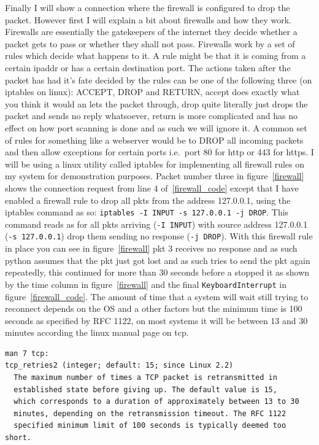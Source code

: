 \documentclass[titlepage]{article}
\begin{document}
Finally I will show a connection where the firewall is configured to drop the packet. However first
I will explain a bit about firewalls and how they work. Firewalls are essentially the gatekeepers
of the internet they decide whether a packet gets to pass or whether they shall not pass. Firewalls
work by a set of rules which decide what happens to it. A rule might be that it is coming from a certain
\gls{ipaddr} or has a certain destination port. The actions taken after the packet has had it's fate
decided by the rules can be one of the following three (on iptables on linux): ACCEPT, DROP and RETURN,
accept does exactly what you think it would an lets the packet through, drop quite literally just drops
the packet and sends no reply whatsoever, return is more complicated and has no effect on how port
scanning is done and as such we will ignore it. A common set of rules for something like a webserver
would be to DROP all incoming packets and then allow exceptions for certain ports i.e.\ port 80 for
\gls{http} or 443 for \gls{https}. I will be using a linux utility called iptables for implementing
all firewall rules on my system for demonstration purposes. Packet number three in
figure~\ref{firewall} shows the connection request from line 4 of~\ref{firewall_code} except
that I have enabled a firewall rule to drop all \glspl{pkt} from the address 127.0.0.1, using
the iptables command as so: \verb$iptables -I INPUT -s 127.0.0.1 -j DROP$. This command reads
as for all \glspl{pkt} arriving (\verb|-I INPUT|) with source address 127.0.0.1 (\verb|-s 127.0.0.1|)
drop them sending no response (\verb|-j DROP|). With this firewall rule in place you can see in
figure~\ref{firewall} \gls{pkt} 3 receives no response and as such python assumes that the \gls{pkt}
just got lost and as such tries to send the \gls{pkt} again repeatedly, this continued for more than
30 seconds before a stopped it as shown by the time column in figure~\ref{firewall} and the final
\verb|KeyboardInterrupt| in figure~\ref{firewall_code}. The amount of time that a system will wait
still trying to reconnect depends on the OS and a other factors but the minimum time is 100 seconds
as specified by RFC 1122, on most systems it will be between 13 and 30 minutes according the
linux manual page on \gls{tcp}.
\begin{verbatim}
man 7 tcp:
tcp_retries2 (integer; default: 15; since Linux 2.2)
  The maximum number of times a TCP packet is retransmitted in
  established state before giving up. The default value is 15,
  which corresponds to a duration of approximately between 13 to 30
  minutes, depending on the retransmission timeout. The RFC 1122
  specified minimum limit of 100 seconds is typically deemed too short.
\end{verbatim}
\end{document}
